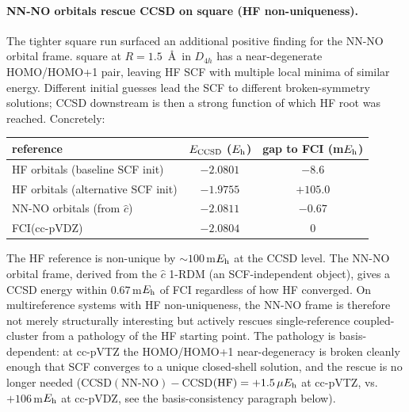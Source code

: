 \documentclass[journal=jctcce,manuscript=article,layout=traditional]{achemso}
\begin{document}
\paragraph{NN-NO orbitals rescue CCSD on  square (HF
non-uniqueness).} The tighter  square run surfaced an
additional positive finding for the NN-NO orbital frame.
 square at $R=1.5$~\AA\ in $D_{4h}$ has a near-degenerate
HOMO/HOMO+1 pair, leaving HF SCF with multiple local minima of
similar energy. Different initial guesses lead the SCF to different
broken-symmetry solutions; CCSD downstream is then a strong function
of which HF root was reached. Concretely:
\begin{center}\renewcommand{\arraystretch}{1.05}\small
\begin{tabular}{lcc}
\toprule
reference & $E_{\rm CCSD}$ ($E_{\rm h}$) & gap to FCI (m$E_{\rm h}$) \\
\midrule
HF orbitals (baseline SCF init)   & $-2.0801$  & $-8.6$   \\
HF orbitals (alternative SCF init) & $-1.9755$ & $+105.0$ \\
NN-NO orbitals (from $\widehat c$) & $-2.0811$ & $-0.67$  \\
\midrule
FCI(cc-pVDZ)                       & $-2.0804$ & 0        \\
\bottomrule
\end{tabular}
\end{center}
The HF reference is non-unique by $\sim\!100$\,m$E_{\rm h}$ at the
CCSD level. The NN-NO orbital frame, derived from the
$\widehat c$ 1-RDM (an SCF-independent object), gives a CCSD energy
within $0.67$\,m$E_{\rm h}$ of FCI regardless of how HF converged.
On multireference systems with HF non-uniqueness, the NN-NO frame
is therefore not merely structurally interesting but actively
rescues single-reference coupled-cluster from a pathology of the HF
starting point. The pathology is basis-dependent: at cc-pVTZ the
HOMO/HOMO+1 near-degeneracy is broken cleanly enough that SCF
converges to a unique closed-shell solution, and the rescue is no
longer needed (CCSD$(\text{NN-NO}) - $CCSD$(\text{HF}) =
+1.5\,\mu E_{\rm h}$ at cc-pVTZ, vs.\ $+106$\,m$E_{\rm h}$ at
cc-pVDZ, see the basis-consistency paragraph below).
\end{document}
